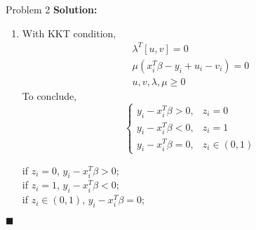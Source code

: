 \documentclass{article}
\newenvironment{solution}                               %
{\textbf{Solution:} }{$\blacksquare$}                   %
\begin{document}
\begin{section}{Problem 2}
\begin{solution}
\begin{enumerate}[label=(\alph*)]
                \item %
                With KKT condition,
                \begin{gather*}
                    \lambda^T [u, v] = 0 \\
                    \mu (x_i^T \beta - y_i + u_i - v_i) = 0\\
                    u, v, \lambda, \mu \geq 0
                \end{gather*}
                To conclude,
                $$
                    \begin{cases}
                        y_i - x_i^T \beta > 0, & z_i = 0 \\
                        y_i - x_i^T \beta < 0, & z_i = 1 \\
                        y_i - x_i^T \beta = 0, & z_i \in (0,1)
                    \end{cases}
                $$
                             
                if $z_i = 0$, $y_i - x_i^T \beta > 0$; \\
                if $z_i = 1$, $y_i - x_i^T \beta < 0$; \\
                if $z_i \in (0,1)$, $y_i - x_i^T \beta = 0$;
            \end{enumerate}
        \end{solution}
    \end{section}
\end{document}
